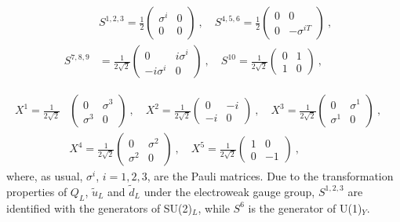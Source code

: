  \begin{equation}
\begin{split}
& S^ {1,2,3} = \frac{1}{2}
\begin{pmatrix}
\sigma^i & 0 \\
0 & 0
\end{pmatrix} \: , \quad
S^ {4,5,6} = \frac{1}{2}
\begin{pmatrix}
0 & 0 \\
0 & -\sigma^{iT}
\end{pmatrix} \: ,  \quad \\
S^ {7,8,9} & = \frac{1}{2 \sqrt 2}
\begin{pmatrix}
0 & i \sigma^i \\
-i \sigma^i & 0
\end{pmatrix} \: , \quad
S^{10} = \frac{1}{2 \sqrt 2}
\begin{pmatrix}
0 & 1 \\
1 & 0
\end{pmatrix} \: , 
\end{split} 
\label{S}
\end{equation}

 \begin{equation}
\begin{split}
X^1 = \frac{1}{2 \sqrt 2}
& \begin{pmatrix}
0 & \sigma^3 \\
\sigma^3 & 0
\end{pmatrix} \:  , \quad
X^2 = \frac{1}{2 \sqrt 2}
\begin{pmatrix}
0 & -i \\
-i & 0
\end{pmatrix} \: ,  \quad 
X^3 = \frac{1}{2 \sqrt 2}
\begin{pmatrix}
0 & \sigma^1 \\
\sigma^1 & 0
\end{pmatrix} \: ,  \quad \\
& X^4 = \frac{1}{2 \sqrt 2}
\begin{pmatrix}
0 & \sigma^2 \\
\sigma^2 & 0
\end{pmatrix} \: , \quad
X^5 = \frac{1}{2 \sqrt 2} 
\begin{pmatrix}
1 & 0 \\
0 & -1
\end{pmatrix} \: ,
\end{split} 
\label{X}
\end{equation}
%
where, as usual, $\sigma^i$,  $i = 1,2,3$, are the Pauli matrices. Due to the transformation properties of $Q_L$, $\tilde u_L$ and $\tilde d_L$ under the electroweak gauge group, $S^{1,2,3}$ are identified with the generators of SU(2)$_L$, while $S^6$ is the generator of U(1)$_Y$.

